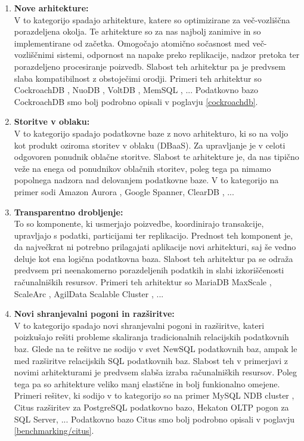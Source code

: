 \documentclass[a4paper, 12pt]{book}
\begin{document}
\begin{enumerate}
    \item \textbf{Nove arhitekture:}\\V to kategorijo spadajo arhitekture, katere so optimizirane za več-vozliščna porazdeljena okolja. Te arhitekture so za nas najbolj zanimive in so implementirane od začetka. Omogočajo atomično sočasnost med več-vozliščnimi sistemi, odpornost na napake preko replikacije, nadzor pretoka ter porazdeljeno procesiranje poizvedb. Slabost teh arhitektur pa je predvsem slaba kompatibilnost z obstoječimi orodji. Primeri teh arhitektur so CockroachDB \cite{cockroachdb/cockroach}, NuoDB \cite{nuodb-home}, VoltDB \cite{voltdb-home}, MemSQL \cite{memsql-home}, ... Podatkovno bazo CockroachDB smo bolj podrobno opisali v poglavju \ref{cockroachdb}.
    \item \textbf{Storitve v oblaku:}\\V to kategorijo spadajo podatkovne baze z novo arhitekturo, ki so na voljo kot produkt oziroma storitev v oblaku (DBaaS). Za upravljanje je v celoti odgovoren ponudnik oblačne storitve. Slabost te arhitekture je, da nas tipično veže na enega od ponudnikov oblačnih storitev, poleg tega pa nimamo popolnega nadzora nad delovanjem podatkovne baze. V to kategorijo na primer sodi Amazon Aurora \cite{aurora-home}, Google Spanner\cite{spanner-home}, ClearDB \cite{cleardb-home}, ...
    \item \textbf{Transparentno drobljenje:}\\To so komponente, ki usmerjajo poizvedbe, koordinirajo transakcije, upravljajo s podatki, particijami ter replikacijo. Prednost teh komponent je, da največkrat ni potrebno prilagajati aplikacije novi arhitekturi, saj še vedno deluje kot ena logična podatkovna baza. Slabost teh arhitektur pa se odraža predvsem pri neenakomerno porazdeljenih podatkih in slabi izkoriščenosti računalniških resursov. Primeri teh arhitektur so MariaDB MaxScale \cite{mariadb-maxscale-home}, ScaleArc \cite{scalearc-home}, AgilData Scalable Cluster \cite{agiledata-home}, ...
    \item \textbf{Novi shranjevalni pogoni in razširitve:}\\V to kategorijo spadajo novi shranjevalni pogoni in razširitve, kateri poizkušajo rešiti probleme skaliranja tradicionalnih relacijskih podatkovnih baz. \cite{Kumar2018Jun} Glede na \cite{Pavlo2016Sep} te rešitve ne sodijo v svet NewSQL podatkovnih baz, ampak le med razširitve relacijskih SQL podatkovnih baz. Slabost teh v primerjavi z novimi arhitekturami je predvsem slabša izraba računalniških resursov. Poleg tega pa so arhitekture veliko manj elastične in bolj funkionalno omejene. Primeri rešitev, ki sodijo v to kategorijo so na primer MySQL NDB cluster \cite{mysqlndbcluster-home}, Citus \cite{citus} razširitev za PostgreSQL podatkovno bazo, Hekaton \cite{hekaton-home} OLTP pogon za SQL Server, ... Podatkovno bazo Citus smo bolj podrobno opisali v poglavju \ref{benchmarking/citus}.
\end{enumerate}
\end{document}
